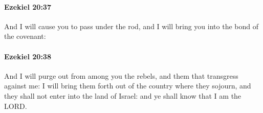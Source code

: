 		\paragraph{Ezekiel 20:37} %
			\label{EZEKIEL-20-37}

			And I will cause you to pass under the rod, and I will bring you into the bond of the covenant:


		\paragraph{Ezekiel 20:38} %
			\label{EZEKIEL-20-38}

			And I will purge out from among you the rebels, and them that transgress against me: I will bring them forth out of the country where they sojourn, and they shall not enter into the land of Israel: and ye shall know that I am the LORD.


